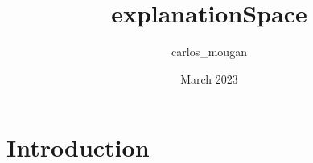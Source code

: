\documentclass{article}
\title{explanationSpace}
\author{carlos_mougan }
\date{March 2023}
\begin{document}
\section{Introduction}
\end{document}

